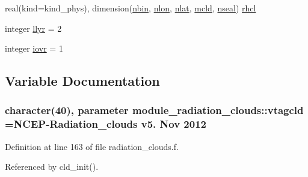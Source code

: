 \begin{DoxyCompactItemize}
\item 
real(kind=kind\+\_\+phys), dimension(\hyperlink{group__module__radiation__clouds_gad2947b3c0a8382fbe12b76dd68b290e0}{nbin}, \hyperlink{group__module__radiation__clouds_gab4d14edea12bbcda5361cad523386c7c}{nlon}, \hyperlink{group__module__radiation__clouds_gad4274cb223949e858ecc2e6346bed610}{nlat}, \hyperlink{group__module__radiation__clouds_gafb94f3d62afa49bef6c33f73a7ecad65}{mcld}, \hyperlink{group__module__radiation__clouds_gaaf2a6549a8c42b9eae3d40d21d1e9532}{nseal}) \hyperlink{group__module__radiation__clouds_ga9673faf82ef00e0501763664743e3720}{rhcl}
\item 
integer \hyperlink{group__module__radiation__clouds_ga3390b20d42afccb3ec569a5b69a93f6e}{llyr} = 2
\item 
integer \hyperlink{group__module__radiation__clouds_ga5cfafee79e8cf066ddd8440cdfdc41a0}{iovr} = 1
\end{DoxyCompactItemize}


\subsection{Variable Documentation}
\subsubsection[{\texorpdfstring{vtagcld}{vtagcld}}]{\setlength{\rightskip}{0pt plus 5cm}character(40), parameter module\+\_\+radiation\+\_\+clouds\+::vtagcld =\textquotesingle{}N\+C\+EP-\/Radiation\+\_\+clouds v5. Nov 2012 \textquotesingle{}\hspace{0.3cm}{\ttfamily [private]}}\hypertarget{namespacemodule__radiation__clouds_a54f11c2f6353f244501cf4ec3553d78b}{}\label{namespacemodule__radiation__clouds_a54f11c2f6353f244501cf4ec3553d78b}


Definition at line 163 of file radiation\+\_\+clouds.\+f.



Referenced by cld\+\_\+init().

